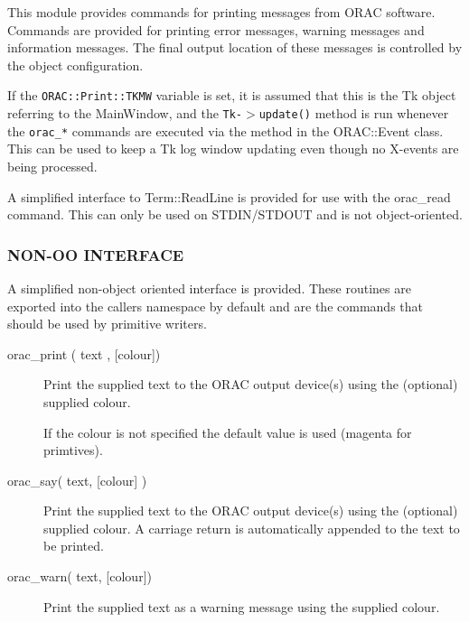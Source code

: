 \begin{description}
\begin{description}
This module provides commands for printing messages from ORAC
software. Commands are provided for printing error messages, warning
messages and information messages. The final output location of these
messages is controlled by the object configuration.



If the \texttt{ORAC::Print::TKMW} variable is set, it is assumed that this
is the Tk object referring to the MainWindow, and the
\texttt{Tk-$>$update()} method is run whenever the \texttt{orac\_*} commands are
executed via the method in the ORAC::Event class.  This can be used to
keep a Tk log window updating even though no X-events are being processed.



A simplified interface to Term::ReadLine is provided for use with
the orac\_read command. This can only be used on STDIN/STDOUT and
is not object-oriented.

\subsubsection*{NON-OO INTERFACE\label{ORAC::Print_NON-OO_INTERFACE}}


A simplified non-object oriented interface is provided.
These routines are exported into the callers namespace by default
and are the commands that should be used by primitive writers.

\begin{description}

\item[{orac\_print ( text , [colour])}] \mbox{}

Print the supplied text to the ORAC output device(s)
using the (optional) supplied colour.



If the colour is not specified the default value is used (magenta
for primtives).


\item[{orac\_say( text, [colour] )}] \mbox{}

Print the supplied text to the ORAC output device(s) using the (optional) supplied colour. A carriage return is automatically appended to the text to be printed.


\item[{orac\_warn( text, [colour])}] \mbox{}

Print the supplied text as a warning message using the supplied
colour.



\end{description}
\end{description}
\end{description}
